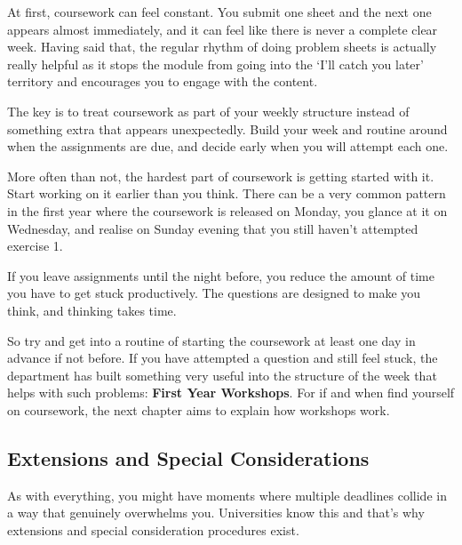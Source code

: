 At first, coursework can feel constant. You submit one sheet and the next one appears almost immediately, and it can feel like there is never a complete clear week. Having said that, the regular rhythm of doing problem sheets is actually really helpful as it stops the module from going into the `I'll catch you later' territory and encourages you to engage with the content. 

The key is to treat coursework as part of your weekly structure instead of something extra that appears unexpectedly. Build your week and routine around when the assignments are due, and decide early when you will attempt each one. 

More often than not, the hardest part of coursework is getting started with it. Start working on it earlier than you think. There can be a very common pattern in the first year where the coursework is released on Monday, you glance at it on Wednesday, and realise on Sunday evening that you still haven't attempted exercise 1. 

If you leave assignments until the night before, you reduce the amount of time you have to get stuck productively. The questions are designed to make you think, and thinking takes time. 

So try and get into a routine of starting the coursework at least one day in advance if not before. If you have attempted a question and still feel stuck, the department has built something very useful into the structure of the week that helps with such problems: \textbf{First Year Workshops}. For if and when find yourself on coursework, the next chapter aims to explain how workshops work. 


\subsection{Extensions and Special Considerations}


As with everything, you might have moments where multiple deadlines collide in a way that genuinely overwhelms you. Universities know this and that's why extensions and special consideration procedures exist. 



